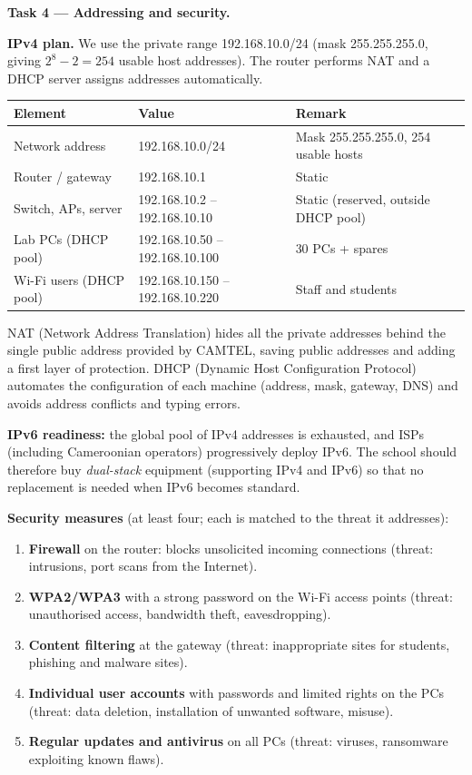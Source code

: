 \documentclass[11pt]{article}
\newcommand{\cle}[1]{{\popxbold\color{popdark}#1}}
\begin{document}
\textbf{Task 4 — Addressing and security.}\par
\textbf{IPv4 plan.} We use the private range 192.168.10.0/24 (mask 255.255.255.0, giving $2^8 - 2 = 254$ usable host addresses). The router performs \cle{NAT} and a \cle{DHCP} server assigns addresses automatically.

\begin{center}
\begin{tabularx}{\linewidth}{|l|X|X|}
\hline
\rowcolor{popblueL} \textbf{Element} & \textbf{Value} & \textbf{Remark} \\
\hline
Network address & 192.168.10.0/24 & Mask 255.255.255.0, 254 usable hosts \\
\hline
Router / gateway & 192.168.10.1 & Static \\
\hline
Switch, APs, server & 192.168.10.2 -- 192.168.10.10 & Static (reserved, outside DHCP pool) \\
\hline
Lab PCs (DHCP pool) & 192.168.10.50 -- 192.168.10.100 & 30 PCs + spares \\
\hline
Wi-Fi users (DHCP pool) & 192.168.10.150 -- 192.168.10.220 & Staff and students \\
\hline
\end{tabularx}
\end{center}

\cle{NAT} (Network Address Translation) hides all the private addresses behind the single public address provided by CAMTEL, saving public addresses and adding a first layer of protection. \cle{DHCP} (Dynamic Host Configuration Protocol) automates the configuration of each machine (address, mask, gateway, DNS) and avoids address conflicts and typing errors.

\textbf{IPv6 readiness:} the global pool of IPv4 addresses is exhausted, and ISPs (including Cameroonian operators) progressively deploy IPv6. The school should therefore buy \emph{dual-stack} equipment (supporting IPv4 and IPv6) so that no replacement is needed when IPv6 becomes standard.

\textbf{Security measures} (at least four; each is matched to the threat it addresses):
\begin{enumerate}
\item \textbf{Firewall} on the router: blocks unsolicited incoming connections (threat: intrusions, port scans from the Internet).
\item \textbf{WPA2/WPA3} with a strong password on the Wi-Fi access points (threat: unauthorised access, bandwidth theft, eavesdropping).
\item \textbf{Content filtering} at the gateway (threat: inappropriate sites for students, phishing and malware sites).
\item \textbf{Individual user accounts} with passwords and limited rights on the PCs (threat: data deletion, installation of unwanted software, misuse).
\item \textbf{Regular updates and antivirus} on all PCs (threat: viruses, ransomware exploiting known flaws).
\end{enumerate}
\end{document}

